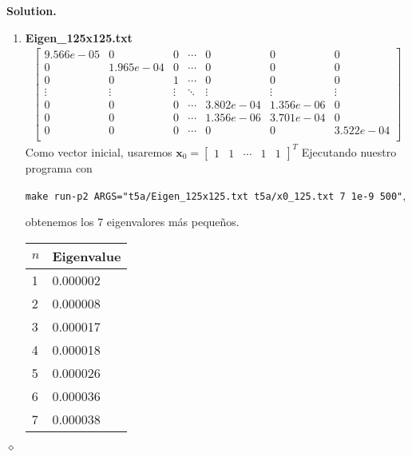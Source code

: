 \documentclass{article}
\theoremstyle{problemstyle}
\newenvironment{solution}{%
  \begin{mdframed}[linewidth=0.8pt,linecolor=Gray,backgroundcolor=Gray!5,roundcorner=5pt]%
  \noindent\textbf{Solution.}%
}{%
\hfill $ \diamond $ 
  \end{mdframed}%
}
\begin{document}
\begin{solution}
\begin{enumerate}
        \item \textbf{Eigen\_125x125.txt}
		      \begin{align*}
			      \begin{bmatrix}
				      9.566e-05 & 0         & 0      & \cdots & 0         & 0         & 0         \\
				      0         & 1.965e-04 & 0      & \cdots & 0         & 0         & 0         \\
				      0 & 0 & 1      & \cdots & 0         & 0         & 0         \\
				      \vdots    & \vdots    & \vdots & \ddots & \vdots    & \vdots    & \vdots    \\
				      0         & 0         & 0      & \cdots & 3.802e-04 & 1.356e-06 & 0         \\
				      0         & 0         & 0      & \cdots & 1.356e-06 & 3.701e-04 & 0         \\
				      0         & 0         & 0      & \cdots & 0         & 0         & 3.522e-04 \\
			      \end{bmatrix}
		      \end{align*}
		      Como vector inicial, usaremos $ \mathbf{x}_0 = \begin{bmatrix}
				      1 & 1 & \cdots & 1 & 1
			      \end{bmatrix}^{T} $
		      Ejecutando nuestro programa con
		      \begin{center}
			      \texttt{make run-p2
				      ARGS="t5a/Eigen\_125x125.txt t5a/x0\_125.txt 7 1e-9 500"},
		      \end{center}
		      obtenemos los 7 eigenvalores m\'as peque\~nos.
		      \begin{table}[H]
			      \begin{center}
				      \begin{tabular}{|l|l|}
					      \hline
					      $ n $ & Eigenvalue \\
					      \hline
					      1     & 0.000002\\
					      \hline
					      2     & 0.000008\\
					      \hline
					      3     & 0.000017\\
					      \hline
					      4     & 0.000018\\
					      \hline
					      5     & 0.000026\\
					      \hline
					      6     & 0.000036\\
					      \hline
					      7     & 0.000038\\

\end{tabular}
\end{center}
\end{table}
\end{enumerate}
\end{solution}
\end{document}
